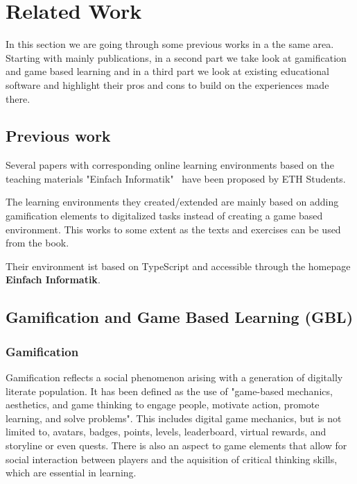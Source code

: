 
\setcounter{chapter}{1}

\chapter{Related Work}\label{ch:relatedwork}
In this section we are going through some previous works in a the same area.
Starting with mainly publications, in a second part we take look at gamification
and game based learning and in a third part we look at existing educational software
and highlight their pros and cons to build on the experiences made there.

\section{Previous work}\label{sec:previous-work}
Several papers with corresponding online learning environments based on the teaching materials "Einfach Informatik"\
\cite{ei56, ei79dat, ei79strat} have been proposed by ETH Students\cite{stblum, skamp, tangk, jweber}.

The learning environments they created/extended are mainly based on adding gamification elements to digitalized tasks
instead of creating a game based environment. This works to some extent as the texts and exercises can be used from the book.

Their environment ist based on TypeScript and accessible through the homepage \textbf{Einfach Informatik}\cite{einfachinformatik}.

\section{Gamification and Game Based Learning (GBL)}\label{sec:gamification-and-game-based-learninggbl}
\subsection{Gamification}\label{subsec:gamification}
Gamification reflects a social phenomenon arising with a generation of digitally literate population.
It has been defined as the use of "game-based mechanics, aesthetics, and game thinking to engage people,
motivate action, promote learning, and solve problems"\cite{kapp2013gamification}.
This includes digital game mechanics, but is not limited to, avatars, badges, points, levels,
leaderboard, virtual rewards, and storyline or even quests.
There is also an aspect to game elements that allow for social interaction between players and the aquisition of
critical thinking skills, which are essential in learning.

